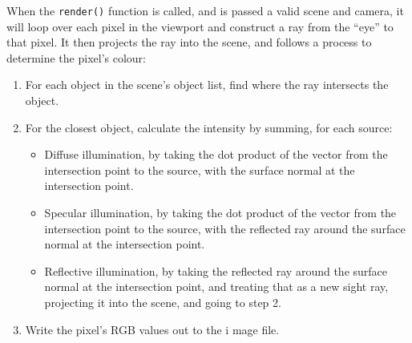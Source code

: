 \documentclass[a4paper]{article}
\begin{document}
When the \verb|render()| function is called, and is passed a valid scene and camera, it will loop over each pixel in the viewport and construct a ray from the ``eye'' to that pixel. It then projects the ray into the scene, and follows a process to determine the pixel's colour:
\begin{enumerate}
  \item For each object in the scene's object list, find where the ray intersects the object.
  \item For the closest object, calculate the intensity by summing, for each source:
  \begin{itemize}
    \item Diffuse illumination, by taking the dot product of the vector from the intersection point to the source, with the surface normal at the intersection point.
    \item Specular illumination, by taking the dot product of the vector from the intersection point to the source, with the reflected ray around the surface normal at the intersection point.
    \item Reflective illumination, by taking the reflected ray around the surface normal at the intersection point, and treating that as a new sight ray, projecting it into the scene, and going to step 2.
  \end{itemize}
  \item Write the pixel's RGB values out to the i
  mage file.
\end{enumerate}


\begin{appendix}
\end{appendix}
\end{document}
